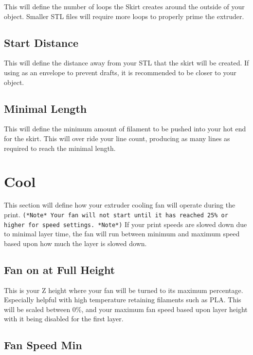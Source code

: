 This will define the number of loops the Skirt creates around the outside of your object. Smaller STL files will require more loops to properly prime the extruder.

\subsection{Start Distance}

This will define the distance away from your STL that the skirt will be created. If using as an envelope to prevent drafts, it is recommended to be closer to your object.

\subsection{Minimal Length}

This will define the minimum amount of filament to be pushed into your hot end for the skirt. This will over ride your line count, producing as many lines as required to reach the minimal length.

\section{Cool}

This section will define how your extruder cooling fan will operate during the print. \texttt{(*Note* Your fan will not start until it has reached 25\% or higher for speed settings. *Note*)} If your print speeds are slowed down due to minimal layer time, the fan will run between minimum and maximum speed based upon how much the layer is slowed down.

\subsection{Fan on at Full Height}

This is your Z height where your fan will be turned to its maximum percentage. Especially helpful with high temperature retaining filaments such as PLA. This will be scaled between 0\%, and your maximum fan speed based upon layer height with it being disabled for the first layer.

\subsection{Fan Speed Min}


